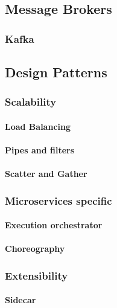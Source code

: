 \documentclass[a4paper, 11pt]{book}
\begin{document}
    \subsection{Message Brokers}

    \subsubsection{Kafka}

    \subsection{Design Patterns}

    \subsubsection{Scalability}

    \paragraph{Load Balancing}

    \paragraph{Pipes and filters}

    \paragraph{Scatter and Gather}

    \subsubsection{Microservices specific}

    \paragraph{Execution orchestrator}

    \paragraph{Choreography}

    \subsubsection{Extensibility}

    \paragraph{Sidecar}
\end{document}
